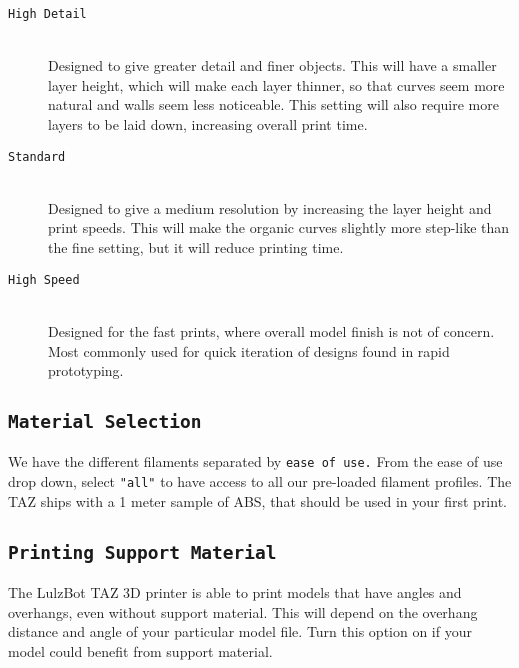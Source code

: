 \begin{description}
\item[\texttt{High Detail}] \hfill \\
Designed to give greater detail and finer objects. This will have a smaller layer height, which will make each layer thinner, so that curves seem more natural and walls seem less noticeable. This setting will also require more layers to be laid down, increasing overall print time.

\item[\texttt{Standard}] \hfill \\
Designed to give a medium resolution by increasing the layer height and print speeds. This will make the organic curves slightly more step-like than the fine setting, but it will reduce printing time.

\item[\texttt{High Speed}] \hfill \\
Designed for the fast prints, where overall model finish is not of concern. Most commonly used for quick iteration of designs found in rapid prototyping.
\end{description}

\subsection{\texttt{Material Selection}}
We have the different filaments separated by \texttt{ease of use.} From the ease of use drop down, select \texttt{"all"} to have access to all our pre-loaded filament profiles. The TAZ ships with a 1 meter sample of ABS, that should be used in your first print.

\subsection{\texttt{Printing Support Material}}
The LulzBot\textsuperscript{\miniscule{\textregistered}} TAZ 3D printer is able to print models that have angles and overhangs, even without support material. This will depend on the overhang distance and angle of your particular model file. Turn this option on if your model could benefit from support material.

